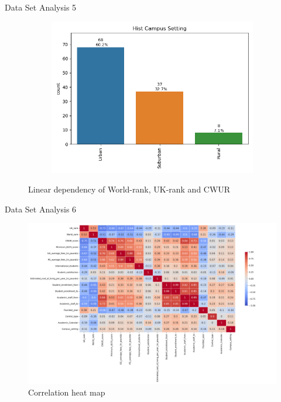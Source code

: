 \documentclass[xcolor=table]{beamer} %
\begin{document}
\begin{frame}{Data Set Analysis 5}
\begin{figure}
\begin{subfigure}[b]{0.48\textwidth}
          \label{fig:hist_international}
      \end{subfigure}
      \hfill
      \vspace{-1cm}
      \begin{subfigure}[b]{0.38\textwidth}
        \centering
        \includegraphics[width=\textwidth, trim={0 0 0 0}, clip]{./figs/bar_hist campus setting.png}
        \label{fig:hist_campus}
      \end{subfigure}

    \caption{Linear dependency of World-rank, UK-rank and CWUR}
    \label{fig:analysis_5}
    \end{figure}
\end{frame}

\begin{frame}{Data Set Analysis 6}
  \vspace{-1.21cm}
  \begin{figure}
    \centering
    \includegraphics[width=0.91 \textwidth]{figs/correlation_heatmap.png}
    \caption{Correlation heat map}
    \label{fig:corr_heatmap}
\end{figure}
\end{frame}
\end{document}
